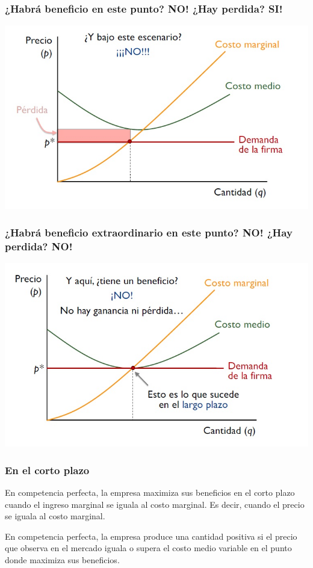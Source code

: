 \documentclass{beamer}
\begin{document}
\begin{frame}
\frametitle{¿Habrá beneficio en este punto? NO! ¿Hay perdida? SI!}
\includegraphics[scale=0.55]{../Figures/Tema_07.12_compperfecta6.jpg}
\end{frame}

\begin{frame}
\frametitle{¿Habrá beneficio extraordinario en este punto? NO! ¿Hay perdida? NO!}
\includegraphics[scale=0.55]{../Figures/Tema_07.13_compperfecta7.jpg}
\end{frame}

\begin{frame}
    \frametitle{En el corto plazo}
    \begin{boxA}
        \centering
        En competencia perfecta, la empresa maximiza sus beneficios en el
        corto plazo cuando el ingreso marginal se iguala al costo marginal.
        Es decir, cuando el precio se iguala al costo marginal.
    \end{boxA}
    \begin{boxA}
        \centering
        En competencia perfecta, la empresa produce una cantidad positiva si el precio que observa en el mercado iguala o supera el costo
        medio variable en el punto donde maximiza sus beneficios.
    \end{boxA}

\end{frame}
\end{document}
